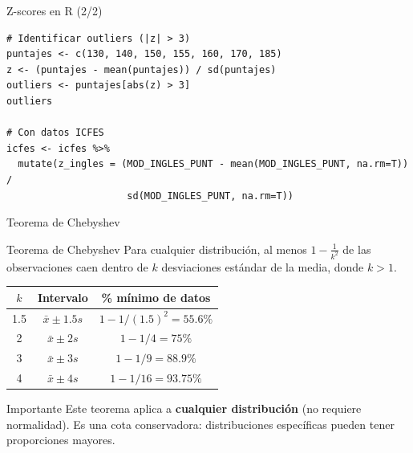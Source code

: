 \documentclass[aspectratio=169, 11pt]{beamer}
\begin{document}
\begin{frame}[fragile]{Z-scores en R (2/2)}
\begin{lstlisting}
# Identificar outliers (|z| > 3)
puntajes <- c(130, 140, 150, 155, 160, 170, 185)
z <- (puntajes - mean(puntajes)) / sd(puntajes)
outliers <- puntajes[abs(z) > 3]
outliers

# Con datos ICFES
icfes <- icfes %>%
  mutate(z_ingles = (MOD_INGLES_PUNT - mean(MOD_INGLES_PUNT, na.rm=T)) /
                     sd(MOD_INGLES_PUNT, na.rm=T))
\end{lstlisting}
\end{frame}

\begin{frame}{Teorema de Chebyshev}
\begin{block}{Teorema de Chebyshev}
Para \alert{cualquier distribución}, al menos $1 - \frac{1}{k^2}$ de las observaciones caen dentro de $k$ desviaciones estándar de la media, donde $k > 1$.
\end{block}

\begin{table}
\centering
\begin{tabular}{ccc}
\toprule
$k$ & Intervalo & \% mínimo de datos \\
\midrule
1.5 & $\bar{x} \pm 1.5s$ & $1 - 1/(1.5)^2 = 55.6\%$ \\
2 & $\bar{x} \pm 2s$ & $1 - 1/4 = 75\%$ \\
3 & $\bar{x} \pm 3s$ & $1 - 1/9 = 88.9\%$ \\
4 & $\bar{x} \pm 4s$ & $1 - 1/16 = 93.75\%$ \\
\bottomrule
\end{tabular}
\end{table}

\vspace{0.5em}
\begin{alertblock}{Importante}
Este teorema aplica a \textbf{cualquier distribución} (no requiere normalidad). Es una cota conservadora: distribuciones específicas pueden tener proporciones mayores.
\end{alertblock}
\end{frame}
\end{document}
